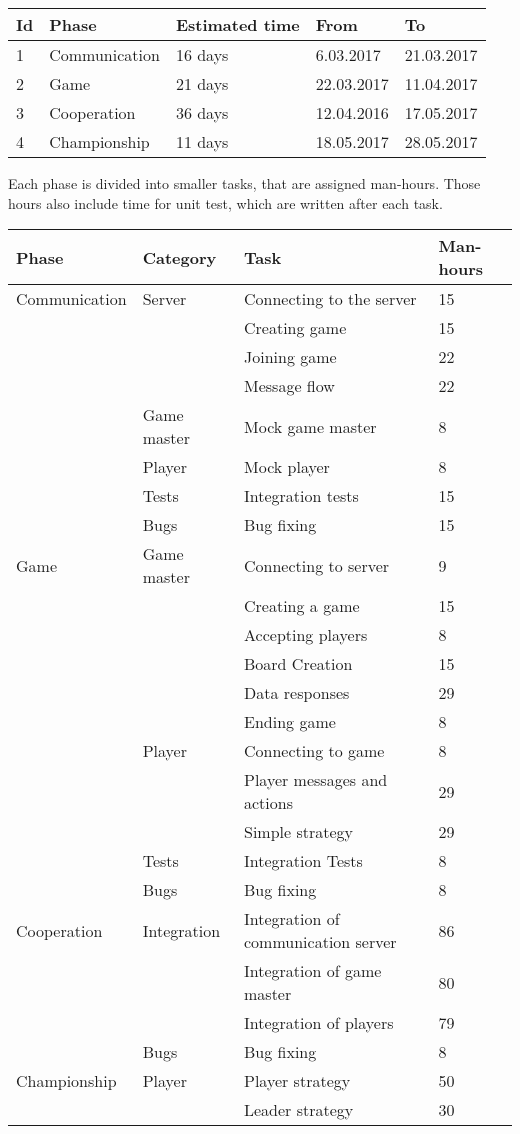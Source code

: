 \documentclass[11pt,a4paper]{article}
\begin{document}
\begin{longtable}{| p{1cm} | p{4cm} | p{3cm} | l | l |}
\hline
\textbf{Id} & \textbf{Phase} & \textbf{Estimated time} & \textbf{From} & \textbf{To} \\ \hline
1 & Communication & 16 days & 6.03.2017 & 21.03.2017 \\ \hline
2 & Game & 21 days & 22.03.2017 & 11.04.2017 \\ \hline
3 & Cooperation & 36 days & 12.04.2016 & 17.05.2017 \\ \hline
4 & Championship & 11 days & 18.05.2017 & 28.05.2017 \\ \hline
\end{longtable}

Each phase is divided into smaller tasks, that are assigned man-hours. Those hours also include time for unit test, which are written after each task.

\begin{tabular}{| p{3.5cm} | p{3cm} | p{4cm} | l |} \hline
\textbf{Phase} & \textbf{Category} & \textbf{Task} & \textbf{Man-hours} \\ \hline
Communication & Server & Connecting to the server & 15 \\ \cline{3-4}
& & Creating game & 15 \\ \cline{3-4}
& & Joining game & 22 \\ \cline{3-4}
& & Message flow & 22 \\ \cline{2-4}
& Game master & Mock game master & 8 \\ \cline{2-4}
& Player & Mock player & 8 \\ \cline{2-4}
& Tests & Integration tests & 15 \\ \cline{2-4}
& Bugs & Bug fixing & 15 \\ \hline
Game & Game master & Connecting to server & 9 \\ \cline{3-4}
& & Creating a game & 15 \\ \cline{3-4}
& & Accepting players & 8 \\ \cline{3-4}
& & Board Creation & 15 \\ \cline{3-4}
& & Data responses & 29 \\ \cline{3-4}
& & Ending game & 8 \\ \cline{2-4}
& Player & Connecting to game & 8 \\ \cline{3-4}
& & Player messages and actions & 29 \\ \cline{3-4}
& & Simple strategy & 29 \\ \cline{2-4}
& Tests & Integration Tests & 8 \\ \cline{2-4}
& Bugs & Bug fixing & 8 \\ \hline
Cooperation & Integration & Integration of communication server & 86 \\ \cline{3-4}
& & Integration of game master & 80 \\ \cline{3-4}
& & Integration of players & 79 \\ \cline{2-4}
& Bugs & Bug fixing & 8 \\ \hline
Championship & Player & Player strategy & 50 \\ \cline{3-4}
& & Leader strategy & 30 \\ \hline
\end{tabular}
\end{document}
